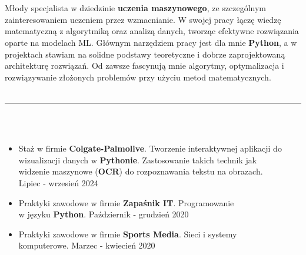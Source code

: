 \documentclass[10pt]{article}
\begin{document}
\begin{paracol}{2}
\begin{rightcolumn}
    \vspace*{-2ex} %
    \noindent {}
    \fontsize{10pt}{10pt}
    \\ \\
    Młody specjalista w dziedzinie \textbf{uczenia maszynowego}, ze szczególnym zainteresowaniem uczeniem przez wzmacnianie.
    W swojej pracy łączę wiedzę matematyczną z algorytmiką oraz analizą danych, tworząc efektywne rozwiązania oparte na modelach ML. 
    Głównym narzędziem pracy jest dla mnie \textbf{Python}, a w projektach stawiam na solidne podstawy teoretyczne i dobrze zaprojektowaną architekturę rozwiązań.
    Od zawsze fascynują mnie algorytmy, optymalizacja i rozwiązywanie złożonych problemów przy użyciu metod matematycznych.
    \\ \\
    \rule{11cm}{1pt} \\ \\
    \fontsize{10pt}{10pt}
    \begin{itemize}[leftmargin=*]
        \setlength{\parskip}{0pt}
        \item Staż w firmie \textbf{Colgate-Palmolive}. Tworzenie interaktywnej aplikacji do
        wizualizacji danych w \textbf{Pythonie}. Zastosowanie takich technik jak \\
        widzenie maszynowe (\textbf{OCR}) do rozpoznawania tekstu na obrazach. \\
        Lipiec - wrzesień 2024
        \item Praktyki zawodowe w firmie \textbf{Zapaśnik IT}. Programowanie \\ 
        w języku \textbf{Python}. Październik - grudzień 2020
        \item Praktyki zawodowe w firmie \textbf{Sports Media}. Sieci i systemy \\
        komputerowe. Marzec - kwiecień 2020
        

\end{itemize}
\end{rightcolumn}
\end{paracol}
\end{document}
